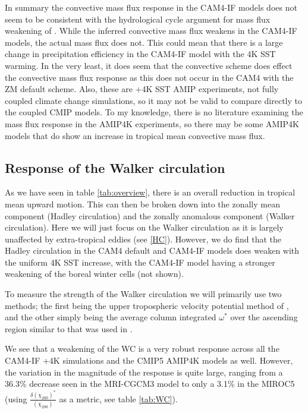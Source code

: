 \documentclass[letterpaper,12pt,titlepage,oneside,final]{book}
\begin{document}
In summary the convective mass flux response in the CAM4-IF models does not seem to be consistent with the hydrological cycle argument for mass flux weakening of \citep{held_robust_2006}. While the inferred convective mass flux weakens in the CAM4-IF models, the actual mass flux does not. This could mean that there is a large change in precipitation efficiency in the CAM4-IF model with the 4K SST warming. In the very least, it does seem that the convective scheme does effect the convective mass flux response as this does not occur in the CAM4 with the ZM default scheme. Also, these are +4K SST AMIP experiments, not fully coupled climate change simulations, so it may not be valid to compare directly to the coupled CMIP models. To my knowledge, there is no literature examining the mass flux response in the AMIP4K experiments, so there may be some AMIP4K models that do show an increase in tropical mean convective mass flux.

\subsection{Response of the Walker circulation} 

As we have seen in table \ref{tab:overview}, there is an overall reduction in tropical mean upward motion. This can then be broken down into the zonally mean component (Hadley circulation) and the zonally anomalous component (Walker circulation). Here we will just focus on the Walker circulation as it is largely unaffected by extra-tropical eddies (see \ref{HC}). However, we do find that the Hadley circulation in the CAM4 default and CAM4-IF models does weaken with the uniform 4K SST increase, with the CAM4-IF model having a stronger weakening of the boreal winter cells (not shown).

To measure the strength of the Walker circulation we will primarily use two methods; the first being the upper tropospheric velocity potential method of \citep{tanaka_trend_2004}, and the other simply being the average column integrated $\omega^{*}$ over the ascending region similar to that was used in \citep{wills_local_2017}.

We see that a weakening of the WC is a very robust response across all the CAM4-IF +4K simulations and the CMIP5 AMIP4K models as well. However, the variation in the magnitude of the response is quite large, ranging from a 36.3\% decrease seen in the MRI-CGCM3 model to only a 3.1\% in the MIROC5 (using $\frac{\delta(\chi_{200})^{*}}{(\chi_{200})}$ as a metric, see table \ref{tab:WC}).
\end{document}
